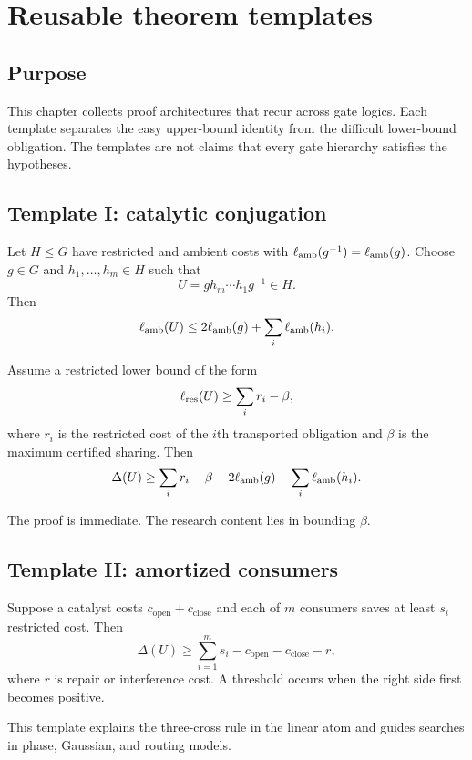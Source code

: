 \chapter{Reusable theorem templates}\label{ch:templates}


\section{Purpose}
This chapter collects proof architectures that recur across gate logics.  Each template separates the easy upper-bound identity from the difficult lower-bound obligation.  The templates are not claims that every gate hierarchy satisfies the hypotheses.

\section{Template I: catalytic conjugation}
Let $H\le G$ have restricted and ambient costs with $\ell_{\mathrm{amb}}(g^{-1})=\ell_{\mathrm{amb}}(g)$.  Choose $g\in G$ and $h_1,\ldots,h_m\in H$ such that
\[
U=g h_m\cdots h_1 g^{-1}\in H.
\]
Then
\[
\ell_{\mathrm{amb}}(U)
\le
2\ell_{\mathrm{amb}}(g)+\sum_i\ell_{\mathrm{amb}}(h_i).
\]

\begin{theorem}
Assume a restricted lower bound of the form
\[
\ell_{\mathrm{res}}(U)
\ge
\sum_i r_i-\beta,
\]
where $r_i$ is the restricted cost of the $i$th transported obligation and $\beta$ is the maximum certified sharing.  Then
\[
\Delta(U)
\ge
\sum_i r_i-\beta
-
2\ell_{\mathrm{amb}}(g)-\sum_i\ell_{\mathrm{amb}}(h_i).
\]
\end{theorem}

The proof is immediate.  The research content lies in bounding $\beta$.

\section{Template II: amortized consumers}
Suppose a catalyst costs $c_{\mathrm{open}}+c_{\mathrm{close}}$ and each of $m$ consumers saves at least $s_i$ restricted cost.  Then
\[
\Delta(U)
\ge
\sum_{i=1}^m s_i
-c_{\mathrm{open}}-c_{\mathrm{close}}-r,
\]
where $r$ is repair or interference cost.  A threshold occurs when the right side first becomes positive.

This template explains the three-cross rule in the linear atom and guides searches in phase, Gaussian, and routing models.

